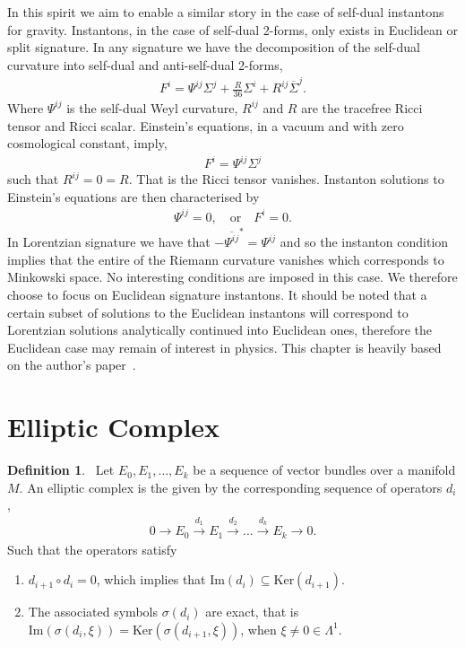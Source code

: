 \documentclass[10pt]{report}
\theoremstyle{definition}
\newtheorem{definition}{Definition}[chapter]
\newcommand{\asd}[0]{\overline{\Sigma}}
\begin{document}
In this spirit we aim to enable a similar story in the case of self-dual instantons for gravity. Instantons, in the case of self-dual 2-forms, only exists in Euclidean or split signature. In any signature we have the decomposition of the self-dual curvature into self-dual and anti-self-dual 2-forms,
\begin{align}
    F^i = \Psi^{ij} \Sigma^j + \frac{R}{36} \Sigma^i + R^{ij} \asd^j.
\end{align}  
Where $\Psi^{ij}$ is the self-dual Weyl curvature, $R^{ij}$ and $R$ are the tracefree Ricci tensor and Ricci scalar. Einstein's equations, in a vacuum and with zero cosmological constant, imply,
\begin{align}
    F^i = \Psi^{ij} \Sigma^j
\end{align}
such that $R^{ij} = 0 = R$. That is the Ricci tensor vanishes. Instanton solutions to Einstein's equations are then characterised by 
\begin{align}
    \Psi^{ij} = 0, \quad \textrm{or} \quad F^i = 0.
\end{align}
In Lorentzian signature we have that $-\overline{\Psi^{ij}}^* = \Psi^{ij}$ and so the instanton condition implies that the entire of the Riemann curvature vanishes which corresponds to Minkowski space. No interesting conditions are imposed in this case. We therefore choose to focus on Euclidean signature instantons. It should be noted that a certain subset of solutions to the Euclidean instantons will correspond to Lorentzian solutions analytically continued into Euclidean ones, therefore the Euclidean case may remain of interest in physics. This chapter is heavily based on the author's paper~\cite{Plebanski_compl_Krasno_2025}.

\section{Elliptic Complex}

\begin{definition}~\label{def:ell-elliptic-complex}
    Let $E_0,E_1,\ldots,E_k$ be a sequence of vector bundles over a manifold $M$. An elliptic complex is the given by the corresponding sequence of operators $d_i$, 
    \begin{align}
        0 \longrightarrow E_0 \overset{d_1}{\longrightarrow} E_1 \overset{d_2}{\longrightarrow} \ldots \overset{d_k}{\longrightarrow} E_k \longrightarrow 0.
    \end{align}
    Such that the operators satisfy 
    \begin{enumerate}
        \item $d_{i+1} \circ d_i = 0$, which implies that $\textrm{Im}(d_i) \subseteq \textrm{Ker}(d_{i+1})$. 
        \item The associated symbols $\sigma(d_i)$ are exact, that is $\textrm{Im}(\sigma(d_i,\xi)) = \textrm{Ker}(\sigma(d_{i+1},\xi))$, when $\xi \neq 0 \in \Lambda^1$.
    \end{enumerate}
\end{definition}
\end{document}
